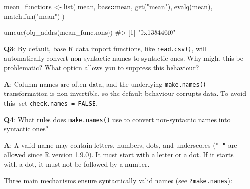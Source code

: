 \documentclass[
]{krantz}
\makeatletter
\newenvironment{Shaded}{\begin{snugshade}}{\end{snugshade}}
\newcommand{\CommentTok}[1]{\textcolor[rgb]{0.56,0.35,0.01}{\textit{#1}}}
\newcommand{\KeywordTok}[1]{\textcolor[rgb]{0.13,0.29,0.53}{\textbf{#1}}}
\newcommand{\NormalTok}[1]{#1}
\newcommand{\OperatorTok}[1]{\textcolor[rgb]{0.81,0.36,0.00}{\textbf{#1}}}
\newcommand{\StringTok}[1]{\textcolor[rgb]{0.31,0.60,0.02}{#1}}
\newenvironment{kframe}{%
\medskip{}
\setlength{\fboxsep}{.8em}
 \def\at@end@of@kframe{}%
 \ifinner\ifhmode%
  \def\at@end@of@kframe{\end{minipage}}%
  \begin{minipage}{\columnwidth}%
 \fi\fi%
 \def\FrameCommand##1{\hskip\@totalleftmargin \hskip-\fboxsep
 \colorbox{shadecolor}{##1}\hskip-\fboxsep
     \hskip-\linewidth \hskip-\@totalleftmargin \hskip\columnwidth}%
 \MakeFramed {\advance\hsize-\width
   \@totalleftmargin\z@ \linewidth\hsize
   \@setminipage}}%
 {\par\unskip\endMakeFramed%
 \at@end@of@kframe}
\renewenvironment{Shaded}{\begin{kframe}}{\end{kframe}}
\renewcommand{\KeywordTok} [1]{\textcolor[rgb]{0.00,0.44,0.13}{{#1}}}
\renewcommand{\StringTok}  [1]{\textcolor[rgb]{0.25,0.44,0.63}{{#1}}}
\renewcommand{\CommentTok} [1]{\textcolor[rgb]{0.38,0.63,0.69}{{#1}}}
\renewcommand{\NormalTok}  [1]{{#1}}
\makeatother
\begin{document}
\begin{Shaded}
\begin{Highlighting}[]
\NormalTok{mean_functions <-}\StringTok{ }\KeywordTok{list}\NormalTok{(}
\NormalTok{  mean,}
\NormalTok{  base}\OperatorTok{::}\NormalTok{mean,}
  \KeywordTok{get}\NormalTok{(}\StringTok{"mean"}\NormalTok{),}
  \KeywordTok{evalq}\NormalTok{(mean),}
  \KeywordTok{match.fun}\NormalTok{(}\StringTok{"mean"}\NormalTok{)}
\NormalTok{)}

\KeywordTok{unique}\NormalTok{(}\KeywordTok{obj_addrs}\NormalTok{(mean_functions))}
\CommentTok{#> [1] "0x138446f0"}
\end{Highlighting}
\end{Shaded}

\textbf{{Q3}}: By default, base R data import functions, like \texttt{read.csv()}, will automatically convert non-syntactic names to syntactic ones. Why might this be problematic? What option allows you to suppress this behaviour?

\textbf{{A}}: Column names are often data, and the underlying \texttt{make.names()} transformation is non-invertible, so the default behaviour corrupts data. To avoid this, set \texttt{check.names\ =\ FALSE}.

\textbf{{Q4}}: What rules does \texttt{make.names()} use to convert non-syntactic names into syntactic ones?

\textbf{{A}}: A valid name may contain letters, numbers, dots, and underscores (\texttt{"\_"} are allowed since R version 1.9.0). It must start with a letter or a dot. If it starts with a dot, it must not be followed by a number.

Three main mechanisms ensure syntactically valid names (see \texttt{?make.names}):
\end{document}
